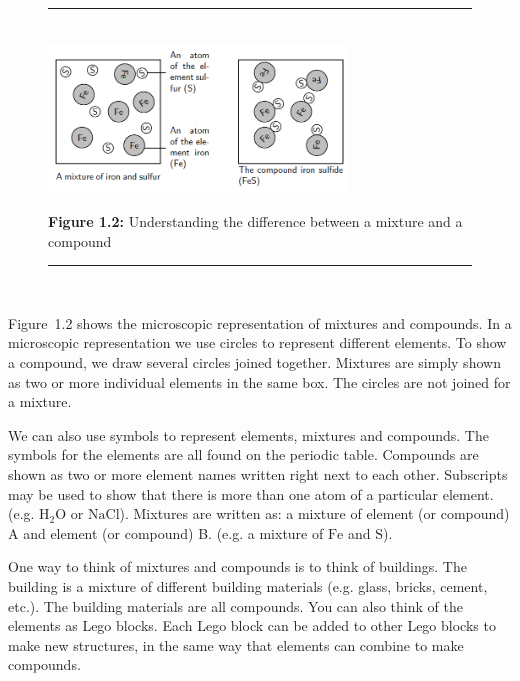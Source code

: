 	\begin{figure}[H] %
    \begin{center}
    \rule[.1in]{\figurerulewidth}{.005in} \\
        \label{m38708*uid27!!!underscore!!!media}\label{m38708*uid27!!!underscore!!!printimage}\includegraphics[width=300px]{col11305.imgs/m38708_CG10C1_003.png} %
      \vspace{2pt}
    \vspace{\rubberspace}\par \begin{cnxcaption}
	  \small \textbf{Figure 1.2: }Understanding the difference between a mixture and a compound
	\end{cnxcaption}
    \vspace{.1in}
    \rule[.1in]{\figurerulewidth}{.005in} \\
    \end{center}
 \end{figure}       
\label{m38708*eip-487}Figure~1.2 shows the microscopic representation of mixtures and compounds. In a microscopic representation we use circles to represent different elements. To show a compound, we draw several circles joined together. Mixtures are simply shown as two or more individual elements in the same box. The circles are not joined for a mixture.\par 
\label{m38708*id0124}We can also use symbols to represent elements, mixtures and compounds. The symbols for the elements are all found on the periodic table. Compounds are shown as two or more element names written right next to each other. Subscripts may be used to show that there is more than one atom of a particular element. (e.g. $\mathrm{H}{}_{2}\mathrm{O}$ or $\mathrm{NaCl}$). Mixtures are written as: a mixture of element (or compound) A and element (or compound) B. (e.g. a mixture of $\mathrm{Fe}$ and $\mathrm{S}$).\par 
\label{m38708*eip-595}One way to think of mixtures and compounds is to think of buildings. The building is a mixture of different building materials (e.g. glass, bricks, cement, etc.). The building materials are all compounds. You can also think of the elements as Lego blocks. Each Lego block can be added to other Lego blocks to make new structures, in the same way that elements can combine to make compounds. \par \label{m38708*eip-524}\vspace{.5cm} 
